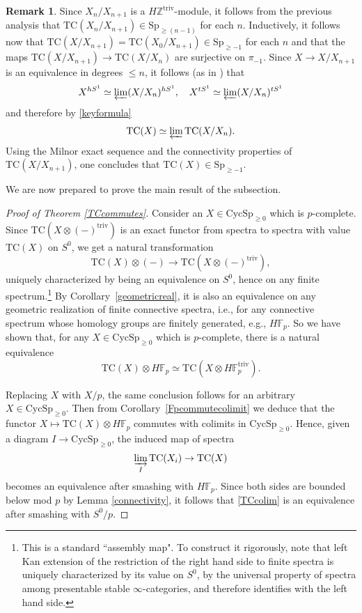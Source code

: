 \documentclass{amsart}
\newcommand{\Sp}{\mathrm{Sp}}
\theoremstyle{definition}
\newtheorem{remark}[definition]{Remark}
\newcommand{\bb}{\mathbb}
\newcommand{\CycSp}{\mathrm{CycSp}}
\newcommand{\TC}{\mathrm{TC}}
\begin{document}
\begin{remark}
Since $X_{n}/X_{n+1}$ is a $H\mathbb{Z}^{\mathrm{triv}}$-module, it follows from
the previous analysis that $\TC(X_n/X_{n+1}) \in \Sp_{\geq (n-1)}$ for each $n$. 
Inductively, 
it follows now that $\TC(X/X_{n+1}) = \TC(X_0/X_{n+1}) \in \Sp_{\geq -1}$ for
each $n$ and that the maps $\TC(X/X_{n+1}) \to \TC(X/X_{n})$ are surjective
on $\pi_{-1}$. 
Since $X \to X/X_{n+1}$ is an equivalence in degrees $\leq n$, it follows (as in \cite[Lem.~I.2.6]{nikolaus-scholze}) that
\[ X^{hS^1} \simeq \varprojlim (X/X_n )^{hS^1}, \quad 
X^{tS^1} \simeq \varprojlim (X/X_n)^{tS^1}
\]
and therefore by \eqref{keyformula}
\[ \TC(X) \simeq \varprojlim \TC(X/X_n).  \]
Using the Milnor exact sequence 
and the connectivity properties of $\TC(X/X_{n+1})$, 
one concludes that $\TC(X) \in \Sp_{\geq -1}$. 
\end{remark} 

We are now prepared to prove the main result of the subsection.

\begin{proof}[Proof of Theorem \ref{TCcommutes}]
Consider an $X \in \CycSp_{\geq 0}$ which is $p$-complete.  Since $\TC(X\otimes (-)^{\mathrm{triv}})$ is an exact functor from spectra to spectra with value $\TC(X)$ on $S^0$, we get a natural transformation
\[ \TC(X) \otimes (-) \to \TC(X \otimes (-)^{\mathrm{triv}}),\]
uniquely characterized by being an equivalence on $S^0$, hence on any finite spectrum.\footnote{This is a standard ``assembly map".  To construct it rigorously, note that left Kan extension of the restriction of the right hand side to finite spectra is uniquely characterized by its value on $S^0$, by the universal property of spectra among presentable stable $\infty$-categories, and therefore identifies with the left hand side.} By Corollary~\ref{geometricreal}, it is also an equivalence on any geometric realization of finite connective spectra, i.e.,
for any connective spectrum whose homology groups are finitely generated, e.g.,
$H \bb F_p$.
So we have shown that, for any $X \in
\CycSp_{\geq 0}$ which is $p$-complete, there is a natural equivalence
$$\TC(X) \otimes H\mathbb{F}_p \simeq \TC(X \otimes
H\mathbb{F}_p^{\mathrm{triv}}).$$

Replacing $X$ with $X/p$, the same conclusion follows for an arbitrary
$X \in \CycSp_{\geq 0}$.  Then from Corollary~\ref{Fpcommutecolimit} we deduce that the functor $X
\mapsto \TC(X) \otimes H\mathbb{F}_p$ commutes
with colimits in $\CycSp_{\geq 0}$. 
Hence, given a diagram $I\to\CycSp_{\geq
0}$, the induced map of spectra
\begin{equation} \label{TCcolim} \varinjlim_I \TC(X_i) \to \TC(X) \end{equation} 
becomes an equivalence after smashing with $H\mathbb{F}_p$. 
Since both sides are bounded below mod $p$ by Lemma \ref{connectivity}, it
follows that \eqref{TCcolim}
is an equivalence after smashing with $S^0/p$.
\end{proof}
\end{document}
